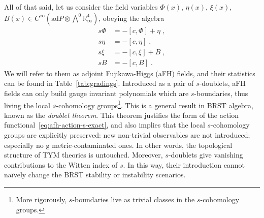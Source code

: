 \documentclass[../main.tex]{subfiles}
\begin{document}
All of that said, let us consider the field variables $\Phi (x)$, $\eta (x)$, $\xi (x)$, $B (x) \in C^{\infty} ( \mathrm{ad} P \otimes \bigwedge^0 \mathbb{R}_{\infty}^{4} )$, obeying the algebra
\begin{subequations}%
  \label{eq:afh-brst}
  \begin{align}
    s \Phi & = - \left[c, \Phi\right] + \eta \;, \\
    s \eta & = -\left[c, \eta\right]  \;,        \\
    s \xi  & = - \left[c, \xi\right] + B \;,     \\
    s B    & = -\left[c, B\right]  \;.
  \end{align}
\end{subequations}
We will refer to them as adjoint Fujikawa-Higgs (aFH) fields, and their statistics can be found in Table~\ref{tab:gradings}. Introduced as a pair of $s$-doublets, aFH fields can only build gauge invariant polynomials which are $s$-boundaries, thus living  the local $s$-cohomology groups\footnote{More rigorously, $s$-boundaries live as trivial classes in the $s$-cohomology groups.}. This is a general result in BRST algebra, known as the \textit{doublet theorem}. This theorem justifies the form of the action functional~\eqref{eq:afh-action-s-exact}, and also implies that the local $s$-cohomology groups are explicitly preserved: new non-trivial observables are not introduced; especially no $\mathrm{g}$ metric-contaminated ones. In other words, the topological structure of TYM theories is untouched. Moreover, $s$-doublets give vanishing contributions to the Witten index of $s$. In this way, their introduction cannot naïvely change the BRST stability or instability scenarios. %
\end{document}
